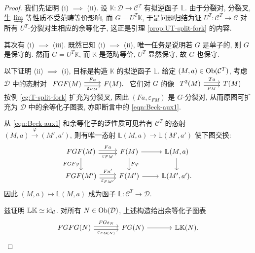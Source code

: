 \begin{proof}
	我们先证明 (i) $\implies$ (ii). 设 $\mathbb{K}: \mathcal{D} \to \mathcal{C}^T$ 有拟逆函子 $\mathbb{L}$. 由于分裂对, 分裂叉, 生 $\varinjlim$ 等性质不受范畴等价影响, 而 $G = U^T \mathbb{K}$, 于是问题归结为证 $U^T: \mathcal{C}^T \to \mathcal{C}$ 对所有 $U^T$-分裂对生相应的余等化子, 这正是引理 \ref{prop:UT-split-fork} 的内容.
	
	其次有 (i) $\implies$ (iii). 既然已知 (i) $\implies$ (ii), 唯一任务是说明若 $G$ 是单子的, 则 $G$ 是保守的. 然而 $G = U^T \mathbb{K}$, 而 $\mathbb{K}$ 是范畴等价, $U^T$ 显然保守, 故 $G$ 也保守.
	
	以下证明 (ii) $\implies$ (i), 目标是构造 $\mathbb{K}$ 的拟逆函子 $\mathbb{L}$. 给定 $(M, a) \in \operatorname{Ob}(\mathcal{C}^T)$, 考虑 $\mathcal{D}$ 中的态射对
	$\begin{tikzcd}
		FGF(M) \arrow[shift left, r, "Fa"] \arrow[shift right, r, "\varepsilon_{FM}"'] & F(M).
	\end{tikzcd}$
	它们对 $G$ 的像
	$\begin{tikzcd}
		T^2(M) \arrow[shift left, r, "Ta"] \arrow[shift right, r, "\mu_M"'] & T(M)
	\end{tikzcd}$\!
	按例 \ref{eg:T-split-fork} 扩充为分裂叉, 因此 $(Fa, \varepsilon_{FM})$ 是 $G$-分裂对, 从而原图可扩充为 $\mathcal{D}$ 中的余等化子图表, 亦即断言中的 \eqref{eqn:Beck-aux1}.
	
	从 \eqref{eqn:Beck-aux1} 和余等化子的泛性质可见若有 $\mathcal{C}^T$ 的态射 $(M, a) \xrightarrow{\varphi} (M', a')$, 则有唯一态射 $\mathbb{L}(M, a) \to \mathbb{L}(M', a')$ 使下图交换:
	\begin{equation*}\begin{tikzcd}
		FGF(M) \arrow[shift left, r, "Fa"] \arrow[shift right, r, "\varepsilon_{FM}"'] \arrow[d, "FGF\varphi"'] & F(M) \arrow[r] \arrow[d, "F\varphi"] & \mathbb{L}(M, a) \arrow[d] \\
		FGF(M') \arrow[shift left, r, "{Fa'}"] \arrow[shift right, r, "\varepsilon_{FM'}"'] & F(M') \arrow[r] & \mathbb{L}(M', a'). 
	\end{tikzcd}\end{equation*}
	因此 $(M, a) \mapsto \mathbb{L}(M, a)$ 成为函子 $\mathbb{L}: \mathcal{C}^T \to \mathcal{D}$.
	
	兹证明 $\mathbb{L}\mathbb{K} \simeq \mathrm{id}_{\mathcal{C}}$. 对所有 $N \in \operatorname{Ob}(\mathcal{D})$, 上述构造给出余等化子图表
	\begin{equation*}\begin{tikzcd}[column sep=large]
		FGFG(N) \arrow[shift left, r, "FG\varepsilon_N"] \arrow[shift right, r, "\varepsilon_{FG(N)}"'] & FG(N) \arrow[r] & \mathbb{L}\mathbb{K}(N).
	\end{tikzcd}\end{equation*}


\end{proof}
